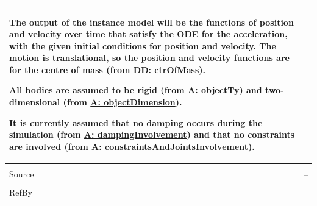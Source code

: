 \documentclass[12pt]{article}
\begin{document}
\begin{minipage}{\textwidth}
\begin{tabular}{>{\raggedright}p{}>{\raggedright\arraybackslash}p{}}
        The output of the instance model will be the functions of position and velocity over time that satisfy the ODE for the acceleration, with the given initial conditions for position and velocity. The motion is translational, so the position and velocity functions are for the centre of mass (from \hyperref[DD:ctrOfMass]{DD: ctrOfMass}).
        
        All bodies are assumed to be rigid (from \hyperref[assumpOT]{A: objectTy}) and two-dimensional (from \hyperref[assumpOD]{A: objectDimension}).
        
        It is currently assumed that no damping occurs during the simulation (from \hyperref[assumpDI]{A: dampingInvolvement}) and that no constraints are involved (from \hyperref[assumpCAJI]{A: constraintsAndJointsInvolvement}).
        
\\ \midrule \\
Source & --
         
\\ \midrule \\
RefBy & 
\\ \bottomrule
\end{tabular}
\end{minipage}
\end{document}
